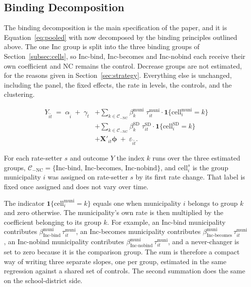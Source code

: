 \documentclass[12pt]{article}
\begin{document}
\subsection{Binding Decomposition}
\label{subsec:stacked-continuous}

The binding decomposition is the main specification of the paper, and it is
Equation~\ref{eq:pooled} with now decomposed by the binding principles outlined above. The one Inc group is split
into the three binding groups of Section~\ref{subsec:cells}, so Inc-bind,
Inc-becomes and Inc-nobind each receive their own coefficient and NC
remains the control. Decrease groups are not estimated, for the
reasons given in Section~\ref{sec:strategy}. Everything else is
unchanged, including the panel, the fixed effects, the rate in levels,
the controls, and the clustering.

\begin{equation}
\begin{split}
Y_{\tilde{i}\tilde{t}} \;=\; \alpha_{\tilde{i}} \;+\; \gamma_{\tilde{t}}
&+ \sum_{k \in \mathcal{C}_{-\text{NC}}} \beta^{\text{muni}}_k \;\tau^{\text{muni}}_{it} \cdot \mathbf{1}\{\text{cell}^{\text{muni}}_i = k\} \\
&+ \sum_{k \in \mathcal{C}_{-\text{NC}}} \beta^{\text{SD}}_k  \;\tau^{\text{SD}}_{it}   \cdot \mathbf{1}\{\text{cell}^{\text{SD}}_i = k\}   \\
&+ \mathbf{X}'_{it}\boldsymbol{\phi}
\;+\; \varepsilon_{\tilde{i}\tilde{t}}.
\end{split}
\label{eq:headline}
\end{equation}

For each rate-setter $s$ and outcome $Y$ the index $k$ runs over the three estimated groups,
$\mathcal{C}_{-\text{NC}} = \{\text{Inc-bind, Inc-becomes, Inc-nobind}\}$,
and $\text{cell}^{s}_{i}$ is the group municipality $i$ was assigned on
rate-setter $s$ by its first rate change. That label is fixed once
assigned and does not vary over time.

The indicator
$\mathbf{1}\{\text{cell}^{\text{muni}}_i = k\}$ equals one when
municipality $i$ belongs to group $k$ and zero otherwise. The municipality's own rate is then multiplied by the
coefficient belonging to its group $k$. For example, an Inc-bind municipality contributes
$\beta^{\text{muni}}_{\text{Inc-bind}}\,\tau^{\text{muni}}_{it}$, an
Inc-becomes municipality contributes
$\beta^{\text{muni}}_{\text{Inc-becomes}}\,\tau^{\text{muni}}_{it}$, an
Inc-nobind municipality contributes
$\beta^{\text{muni}}_{\text{Inc-nobind}}\,\tau^{\text{muni}}_{it}$, and a
never-changer is set to zero because it is the comparison group. The sum is
therefore a compact way of writing three separate slopes, one per group,
estimated in the same regression against a shared set of controls. The second summation does the same on the
school-district side.
\end{document}

